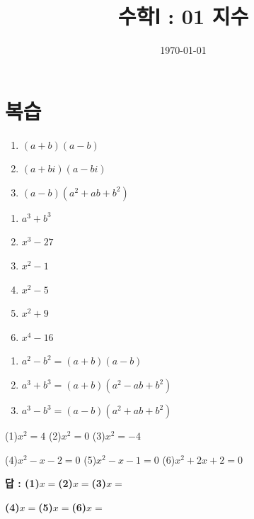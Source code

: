 \documentclass{oblivoir}
\begin{document}
\title{수학Ⅰ : 01 지수}
\author{}
\date{\today}
\maketitle
\tableofcontents
\newpage

\section{복습}

%
\begin{enumerate}[itemsep=10pt]\label{review1}
\item
\((a+b)(a-b)\)
\item
\((a+bi)(a-bi)\)
\item
\((a-b)(a^2+ab+b^2)\)
\end{enumerate}

%
\begin{enumerate}[itemsep=10pt]\label{review2}
\item
\(a^3+b^3\)
\item
\(x^3-27\)
\item
\(x^2-1\)
\item
\(x^2-5\)
\item
\(x^2+9\)
\item
\(x^4-16\)
\end{enumerate}

\begin{mdframed}[frametitle={기본적인 인수분해 공식}]
\begin{enumerate}
\item
\(a^2-b^2=(a+b)(a-b)\)
\item
\(a^3+b^3=(a+b)(a^2-ab+b^2)\)
\item
\(a^3-b^3=(a-b)(a^2+ab+b^2)\)
\end{enumerate}
\end{mdframed}
\newpage

%
\label{review3}
\par\noindent
(1)\:\:\(x^2=4\)
(2)\:\:\(x^2=0\)
(3)\:\:\(x^2=-4\)
\par\noindent
(4)\:\:\(x^2-x-2=0\)
(5)\:\:\(x^2-x-1=0\)
(6)\:\:\(x^2+2x+2=0\)
\begin{mdframed}
\vspace{0.3\textheight}
\end{mdframed}
{\par\raggedleft\textbf{답 :
(1)\:\:\(x=\)\qquad\qquad(2)\:\:\(x=\)\qquad\qquad(3)\:\:\(x=\)\qquad\qquad\qquad}
\par}
{\par\raggedleft\textbf{
(4)\:\:\(x=\)\qquad\qquad(5)\:\:\(x=\)\qquad\qquad(6)\:\:\(x=\)\qquad\qquad\qquad}
\par}
\bigskip
\end{document}
